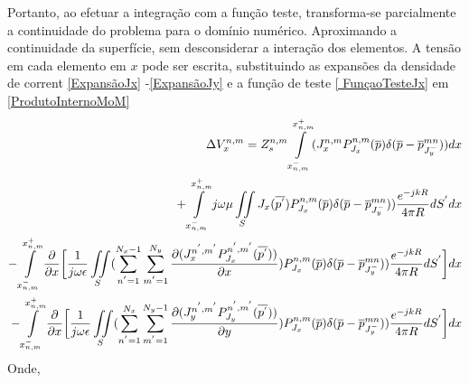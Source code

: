 \documentclass[
	12pt,				%
	openright,			%
	oneside,			%
	a4paper,			%
	english,			%
	brazil				%
	]{abntex2}
\begin{document}
\begin{apendicesenv}
\begin{figure}[htb]
\end{figure}
Portanto, ao efetuar  a integração com a função teste, transforma-se parcialmente a continuidade do problema para o domínio numérico. Aproximando a continuidade da superfície, sem desconsiderar a interação dos elementos. A tensão em cada elemento em $x$ pode ser escrita, substituindo as expansões da densidade de corrent \ref{ExpansãoJx} -\ref{ExpansãoJy} e a função de teste \ref{ FunçaoTesteJx} em \ref{ProdutoInternoMoM}
\begin{equation}{\label{ProdutoInternoMoMDiscreto}}
\begin{aligned}
 \Delta V_{x}^{n,m}=Z_s^{n,m}    \int \limits_{x_{n,m}^{-}}^{x_{n,m}^{+}} (J_{x}^{n,m} P_{J_x}^{n,m}(\overline{p}) \delta (\overline{p}-\overline{p}^{{mn}}_{J^{-}_y}))dx \\
      +
 \int \limits_{x_{n,m}^{-}}^{x_{n,m}^{+}}    j\omega \mu  \iint\limits_{S} J_x(\overline{p^{'}}) P_{J_x}^{n,m}(\overline{p})\delta (\overline{p}-\overline{p}^{{mn}}_{J^{-}_y}) ) \frac{e^{-j k R}}{4 \pi R} dS^{'}   dx
 \\
  -  \int \limits_{x_{n,m}^{-}}^{x_{n,m}^{+}}     \frac{\partial }{\partial x}\biggl[ \frac{1}{j\omega \epsilon}\iint\limits_S  (\sum_{n^{'}=1}^{N_x-1}\sum_{m^{'}=1}^{N_y}\frac{\partial (J_{x}^{n^{'},m^{'}}P_{J_x}^{n^{'},m^{'}}(\overline{p^{'}})  )}{\partial x}  )P_{J_x}^{n,m}(\overline{p})\delta (\overline{p}-\overline{p}^{{mn}}_{J^{-}_y})) \frac{e^{-j k R}}{4 \pi R} dS^{'}  \biggl] dx \\
    -  \int \limits_{x_{n,m}^{-}}^{x_{n,m}^{+}}     \frac{\partial }{\partial x}\biggl[ \frac{1}{j\omega \epsilon}\iint\limits_S  (\sum_{n^{'}=1}^{N_x}\sum_{m^{'}=1}^{N_y-1} \frac{\partial (J_{y}^{n^{'},m^{'}}P_{J_y}^{n^{'},m^{'}} (\overline{p^{'}})    )}{\partial y}  )P_{J_x}^{n,m}(\overline{p})\delta (\overline{p}-\overline{p}^{{mn}}_{J^{-}_y})) \frac{e^{-j k R}}{4 \pi R} dS^{'}  \biggl] dx

\end{aligned}
\end{equation}
Onde,  


\end{apendicesenv}
\end{document}
